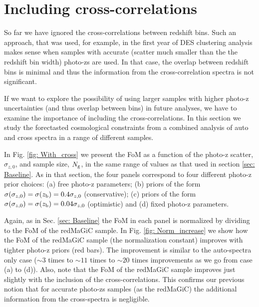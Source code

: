 \documentclass[a4paper,fleqn,usenatbib]{mnras}
\begin{document}
\section{Including cross-correlations}
\label{sec: Cross_correlations}

So far we have ignored the cross-correlations between redshift bins. Such an approach, that was used, for example, in the first year of DES clustering analysis makes sense when samples with accurate (scatter much smaller than the the redshift bin width) photo-zs are used. In that case, the overlap between redshift bins is minimal and thus the information from the cross-correlation spectra is not significant.

If we want to explore the possibility of using larger samples with higher photo-z uncertainties (and thus overlap between bins) in future analyses, we have to examine the importance of including the cross-correlations. In this section we study the forectasted cosmological constraints from a combined analysis of auto and cross spectra in a range of different samples.

\begin{figure*}
\centering

\caption{Similar to Fig. \ref{fig: Baseline}, but taking into account the cross-correlations between bins.}
\label{fig: With_cross}
\end{figure*}


In Fig. \ref{fig: With_cross} we present the FoM as a function of the photo-z scatter, $\sigma_{z,0}$,  and sample size, $N_{\mbox{\scriptsize{g}}}$, in the same range of values as that used in section \ref{sec: Baseline}. As in that section, the four panels  correspond to four different photo-z prior choices: (a) free photo-z parameters; (b) priors of the form $\sigma(\sigma_{z,0}) = \sigma(z_{\mbox{\scriptsize{b}}}) = 0.4  \sigma_{z,0}$ (conservative); (c) priors of the form $\sigma(\sigma_{z,0}) = \sigma(z_{\mbox{\scriptsize{b}}}) = 0.04  \sigma_{z,0}$ (optimistic)  and (d) fixed photo-z parameters.

Again, as in Sec. \ref{sec: Baseline} the FoM in each panel is normalized by dividing to the FoM of the redMaGiC sample. In Fig. \ref{fig: Norm_increase}  we show how the FoM of the redMaGiC sample (the normalization constant) improves with tighter photo-z priors (red bars). The improvement is similar to the auto-spectra only case ($\sim 3$ times to $\sim 11$ times to $\sim 20$ times improvements as we go from case (a) to (d)). Also, note that the FoM of the redMaGiC sample improves just slightly with the inclusion of the cross-correlations. This confirms our previous notion that for accurate photo-zs samples (as the redMaGiC) the additional information from the cross-spectra is negligible.
\end{document}
